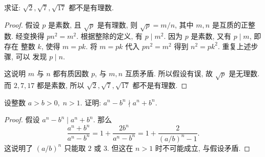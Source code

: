 \documentclass[a5paper,fleqn,10pt]{article}
\begin{document}
\begin{exmp}
    求证: $\sqrt{2},\sqrt{7},\sqrt{17}$ 都不是有理数.
    \begin{proof}
        假设 $p$ 是素数, 且 $\sqrt{p}$ 是有理数, 则 $\sqrt{p}=m/n$, 其中 $m,n$ 是互质的正整数.
        经变换得 $pn^2=m^2$. 根据整除的定义, 有 $p\mid m^2$. 因为 $p$ 是素数, 又有 $p\mid m$, 即存在
        整数 $k$, 使得 $m=pk$. 将 $m=pk$ 代入 $pn^2=m^2$ 得到 $n^2=pk^2$. 重复上述步骤, 可以
        发现 $p\mid n$.
        
        这说明 $m$ 与 $n$ 都有质因数 $p$, 与 $m,n$ 互质矛盾. 所以假设有误, 故 $\sqrt{p}$ 是无理数.
        而 $2,7,17$ 都是素数, 所以 $\sqrt{2},\sqrt{7},\sqrt{17}$ 都不是有理数.\qedhere
    \end{proof}
\end{exmp}

\begin{exmp}
    设整数 $a>b>0,\;n>1$. 证明: $a^n-b^n\nmid a^n+b^n$.
    \begin{proof}
        假设 $a^n-b^n\mid a^n+b^n$. 那么
        \[
            \frac{a^n+b^n}{a^n-b^n}=1+\frac{2b^n}{a^n-b^n}=1+\frac{2}{(a/b)^n-1}.
        \]
        这说明了 $(a/b)^n$ 只能取 $2$ 或 $3$. 但这在 $n>1$ 时不可能成立, 与假设矛盾.
    \end{proof}
\end{exmp}
\end{document}
